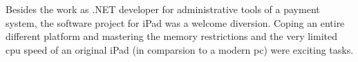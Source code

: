 
Besides the work as .NET developer for administrative tools of a payment system, 
the software project \Nyaya for iPad was a welcome diversion.
Coping an entire different platform and mastering 
the memory restrictions and the very limited cpu speed of an original iPad 
(in comparsion to a modern pc) were exciting tasks. 


